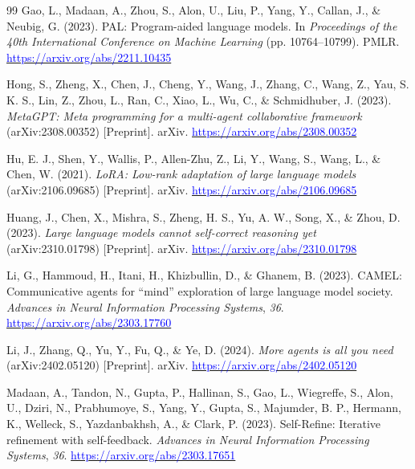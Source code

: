 \documentclass[11pt]{article}
\begin{document}
\begin{thebibliography}{99}
Gao, L., Madaan, A., Zhou, S., Alon, U., Liu, P., Yang, Y., Callan, J., \& Neubig, G.
(2023). PAL: Program-aided language models. In \textit{Proceedings of the 40th International
Conference on Machine Learning} (pp. 10764--10799). PMLR.
\href{https://arxiv.org/abs/2211.10435}{\textcolor{blue}{https://arxiv.org/abs/2211.10435}}

Hong, S., Zheng, X., Chen, J., Cheng, Y., Wang, J., Zhang, C., Wang, Z., Yau, S. K. S.,
Lin, Z., Zhou, L., Ran, C., Xiao, L., Wu, C., \& Schmidhuber, J. (2023).
\textit{MetaGPT: Meta programming for a multi-agent collaborative framework}
(arXiv:2308.00352) [Preprint]. arXiv.
\href{https://arxiv.org/abs/2308.00352}{\textcolor{blue}{https://arxiv.org/abs/2308.00352}}

Hu, E. J., Shen, Y., Wallis, P., Allen-Zhu, Z., Li, Y., Wang, S., Wang, L., \& Chen, W.
(2021). \textit{LoRA: Low-rank adaptation of large language models} (arXiv:2106.09685)
[Preprint]. arXiv.
\href{https://arxiv.org/abs/2106.09685}{\textcolor{blue}{https://arxiv.org/abs/2106.09685}}

Huang, J., Chen, X., Mishra, S., Zheng, H. S., Yu, A. W., Song, X., \& Zhou, D. (2023).
\textit{Large language models cannot self-correct reasoning yet} (arXiv:2310.01798)
[Preprint]. arXiv.
\href{https://arxiv.org/abs/2310.01798}{\textcolor{blue}{https://arxiv.org/abs/2310.01798}}

Li, G., Hammoud, H., Itani, H., Khizbullin, D., \& Ghanem, B. (2023). CAMEL: Communicative
agents for ``mind'' exploration of large language model society. \textit{Advances in Neural
Information Processing Systems}, \textit{36}.
\href{https://arxiv.org/abs/2303.17760}{\textcolor{blue}{https://arxiv.org/abs/2303.17760}}

Li, J., Zhang, Q., Yu, Y., Fu, Q., \& Ye, D. (2024). \textit{More agents is all you need}
(arXiv:2402.05120) [Preprint]. arXiv.
\href{https://arxiv.org/abs/2402.05120}{\textcolor{blue}{https://arxiv.org/abs/2402.05120}}

Madaan, A., Tandon, N., Gupta, P., Hallinan, S., Gao, L., Wiegreffe, S., Alon, U.,
Dziri, N., Prabhumoye, S., Yang, Y., Gupta, S., Majumder, B. P., Hermann, K., Welleck, S.,
Yazdanbakhsh, A., \& Clark, P. (2023). Self-Refine: Iterative refinement with self-feedback.
\textit{Advances in Neural Information Processing Systems}, \textit{36}.
\href{https://arxiv.org/abs/2303.17651}{\textcolor{blue}{https://arxiv.org/abs/2303.17651}}


\end{thebibliography}
\end{document}

